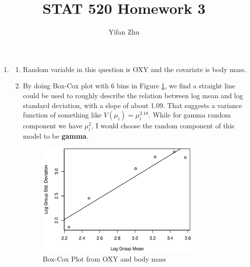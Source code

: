 \documentclass{article}
\begin{document}
	

	
	\title{STAT 520 Homework 3}
	\author{Yifan Zhu}
	\maketitle
	
	\begin{enumerate}[leftmargin = 0 em, label = 3.\arabic*., font = \bfseries]
	\item 
	\begin{enumerate}[label = \arabic*.]
		\item Random variable in this question is OXY and the covariate is body mass.

		 \item 
		 By doing Box-Cox plot with 6 bins in Figure \ref{Box-Cox}, we find a straight line could be used to roughly describe the relation between log mean and log standard deviation, with a slope of about 1.09. That suggests a variance function of something like $V(\mu_i) = \mu_i^{2.18}$. While for gamma random component we have $\mu_i^2$, I would choose the random component of this model to be \textbf{gamma}.
		 \begin{figure}[!htb]
		 	\centering
		 	\includegraphics[width = 0.8\textwidth]{Box-Cox.eps}
		 	\caption{Box-Cox Plot from OXY and body mass}
		 	\label{Box-Cox}
		 \end{figure}


\end{enumerate}
\end{enumerate}
\end{document}
